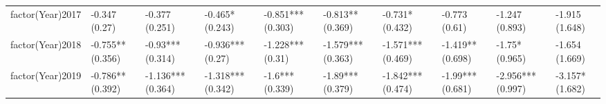 \begin{table}[ht]
\begin{tabular}{llllllllll}
  factor(Year)2017 & -0.347 (0.27) & -0.377 (0.251) & -0.465* (0.243) & -0.851*** (0.303) & -0.813** (0.369) & -0.731* (0.432) & -0.773 (0.61) & -1.247 (0.893) & -1.915 (1.648) \\ 
  factor(Year)2018 & -0.755** (0.356) & -0.93*** (0.314) & -0.936*** (0.27) & -1.228*** (0.31) & -1.579*** (0.363) & -1.571*** (0.469) & -1.419** (0.698) & -1.75* (0.965) & -1.654 (1.669) \\ 
  factor(Year)2019 & -0.786** (0.392) & -1.136*** (0.364) & -1.318*** (0.342) & -1.6*** (0.339) & -1.89*** (0.379) & -1.842*** (0.474) & -1.99*** (0.681) & -2.956*** (0.997) & -3.157* (1.682) \\ 
   \bottomrule
\end{tabular}
\endgroup
\end{table}
